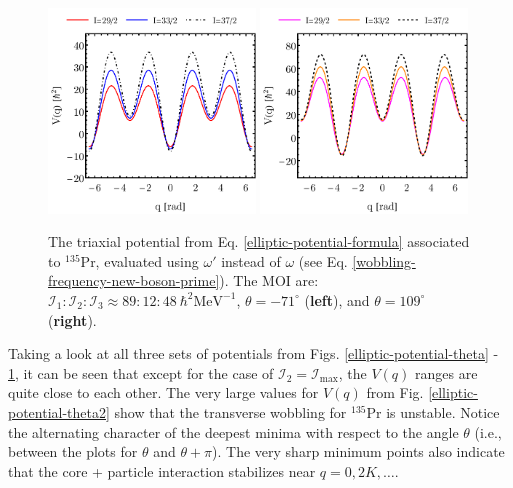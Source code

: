 \begin{figure}
    \centering
    \includegraphics[width=0.49\textwidth]{Chapters/Figures/potential-fit3-theta.pdf}
    \includegraphics[width=0.49\textwidth]{Chapters/Figures/potential-fit3-theta-pi.pdf}
    \caption{The triaxial potential from Eq. \ref{elliptic-potential-formula} associated to $^{135}$Pr, evaluated using $\omega'$ instead of $\omega$ (see Eq. \ref{wobbling-frequency-new-boson-prime}). The MOI are: $\mathcal{I}_1:\mathcal{I}_2:\mathcal{I}_3\approx89:12:48\ \hbar^2\text{MeV}^{-1}$, $\theta=-71^\circ$ (\textbf{left}), and $\theta=109^\circ$ (\textbf{right}).}
    \label{elliptic-potential-theta3}
\end{figure}

Taking a look at all three sets of potentials from Figs. \ref{elliptic-potential-theta} - \ref{elliptic-potential-theta3}, it can be seen that except for the case of $\mathcal{I}_2=\mathcal{I}_\text{max}$, the $V(q)$ ranges are quite close to each other. The very large values for $V(q)$ from Fig. \ref{elliptic-potential-theta2} show that the transverse wobbling for $^{135}$Pr is unstable. Notice the alternating character of the deepest minima with respect to the angle $\theta$ (i.e., between the plots for $\theta$ and $\theta+\pi$). The very sharp minimum points also indicate that the core + particle interaction stabilizes near $q=0,2K,\dots$. 

